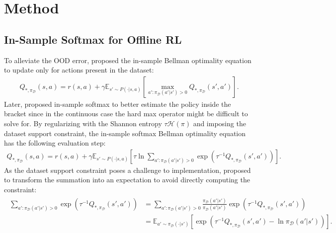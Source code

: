 \documentclass{article}
\newcommand{\AdaBracket}[1]{\left(#1\right)}
\newcommand{\AdaRectBracket}[1]{\left[#1\right]}
\newcommand{\expectation}[2]{\mathbb{E}_{#1}\AdaRectBracket{#2}}
\newcommand{\entropy}{\mathcal{H}\left( \pi \right)}
\newcommand{\datasetOptimalQ}{Q_{*, \pi_{\mathcal{D}}}}
\newcommand{\datasetPolicy}{\pi_{\mathcal{D}}}
\begin{document}
\section{Method}

\subsection{In-Sample Softmax for Offline RL}


To alleviate the OOD error, \citet{Fujimoto2019-InSampleMax} proposed the in-sample Bellman optimality equation to update only for actions present in the dataset:
\begin{align}
    \datasetOptimalQ(s,a) = r(s,a) + \gamma \expectation{s'\sim P(\cdot | s,a)}{\max_{a': \datasetPolicy(a'|s') > 0} \datasetOptimalQ(s',a')}.
    \label{eq:hardmax_offline}
\end{align}
Later, \citet{Xiao2023-InSampleSoftmax} proposed in-sample softmax to better estimate the policy inside the bracket since in the continuous case the hard max operator might be difficult to solve for.
By regularizing with the Shannon entropy $\tau \entropy$ and imposing the dataset support constraint, the in-sample softmax Bellman optimality equation has the following evaluation step:
\begin{align}
    \datasetOptimalQ (s,a) = r(s,a) +  \gamma \expectation{s'\sim P(\cdot | s,a)}{\tau \ln \!\!\!\!\!\sum_{a': \datasetPolicy(a'|s') > 0} \!\!\!\!\! \exp\AdaBracket{\tau^{-1} \datasetOptimalQ(s',a')}}.
\end{align}
As the dataset support constraint poses a challenge to implementation, \citet{Xiao2023-InSampleSoftmax} proposed to transform the summation into an expectation to avoid directly computing the constraint: 
\begin{align}
    \begin{split}
    \sum_{a': \datasetPolicy(a'|s') > 0} \!\!\!\!\!\!\exp\AdaBracket{\tau^{-1}\datasetOptimalQ (s',a')} &= \!\!\!\!\!\!\sum_{a': \datasetPolicy(a'|s') > 0} \frac{\datasetPolicy(a'|s')}{\datasetPolicy(a'|s')} \exp\AdaBracket{\tau^{-1}\datasetOptimalQ (s',a')} \\
    &= \expectation{a'\sim\datasetPolicy(\cdot | s')}{\exp\AdaBracket{\tau^{-1}\datasetOptimalQ (s',a') - \ln\datasetPolicy(a'|s')}}.
    \end{split}
\end{align}
\end{document}
